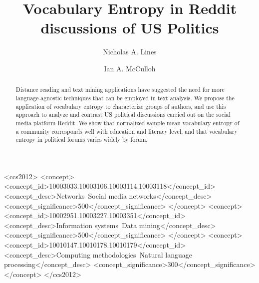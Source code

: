 \documentclass[sigconf]{acmart}
\begin{document}
\title{Vocabulary Entropy in Reddit discussions of US Politics}

\author{Nicholas A. Lines}
\author{Ian A. McCulloh}
\authornotemark[1]

\renewcommand{\shortauthors}{Lines and McCulloh}

\begin{abstract}
  Distance reading and text mining applications have suggested the need for more language-agnostic techniques
  that can be employed in text analysis. We propose the application of vocabulary entropy to characterize groups of authors,
  and use this approach to analyze and contrast US political discussions carried out on the social media platform
  Reddit. We show that normalized sample mean vocabulary entropy of a community corresponds well with education and literacy
  level, and that vocabulary entropy in political forums varies widely by forum.
\end{abstract}

\begin{CCSXML}
<ccs2012>
   <concept>
       <concept_id>10003033.10003106.10003114.10003118</concept_id>
       <concept_desc>Networks~Social media networks</concept_desc>
       <concept_significance>500</concept_significance>
       </concept>
   <concept>
       <concept_id>10002951.10003227.10003351</concept_id>
       <concept_desc>Information systems~Data mining</concept_desc>
       <concept_significance>500</concept_significance>
       </concept>
   <concept>
       <concept_id>10010147.10010178.10010179</concept_id>
       <concept_desc>Computing methodologies~Natural language processing</concept_desc>
       <concept_significance>300</concept_significance>
       </concept>
 </ccs2012>
\end{CCSXML}
\end{document}
